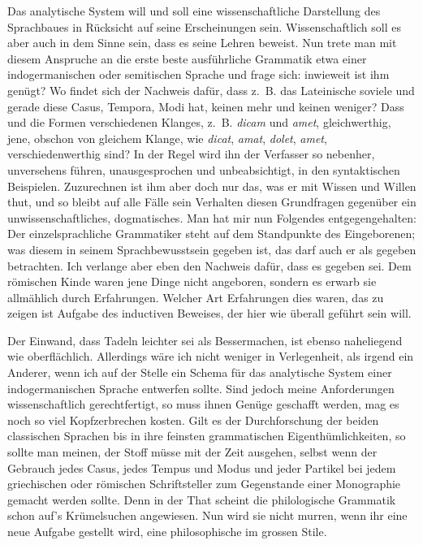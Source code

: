 Das analytische System will und soll eine wissenschaftliche Darstellung des Sprachbaues in Rücksicht auf seine Erscheinungen sein. Wissenschaftlich soll es aber auch in dem Sinne sein, dass es seine Lehren beweist. Nun trete man mit diesem Anspruche an die erste beste ausführliche Grammatik etwa einer indogermanischen oder semitischen Sprache und frage sich: inwieweit ist ihm \label{sp.92} genügt? Wo findet sich der Nachweis dafür, dass z.~B. das Lateinische soviele und gerade diese Casus, Tempora, Modi hat, keinen mehr und keinen weniger? Dass  und die Formen verschiedenen Klanges, z.~B. \textit{dicam} und \textit{amet}, gleichwerth\-ig, jene, obschon von gleichem Klange, wie \textit{dicat}, \textit{amat}, \textit{dolet}, \textit{amet}, verschiedenwerthig sind? In der Regel wird ihn der Verfasser so nebenher, unversehens führen, unausgesprochen und unbeabsichtigt, in den syntaktischen Beispielen. Zuzurechnen ist ihm aber doch nur das, was er mit Wissen und Willen thut, und so bleibt auf alle Fälle sein Verhalten diesen Grundfragen gegenüber ein unwissenschaftliches, dogmatisches. Man hat mir nun Folgendes entgegengehalten: Der einzelsprachliche Grammatiker steht auf dem Standpunkte des Eingeborenen; was diesem in seinem Sprachbewusstsein gegeben ist, das darf auch er als gegeben betrachten. Ich verlange aber eben den Nachweis dafür, dass es gegeben sei. Dem römischen Kinde waren jene Dinge nicht angeboren, sondern es erwarb sie allmählich durch Erfahrungen. Welcher Art Erfahrungen dies waren, das zu zeigen ist Aufgabe des inductiven Beweises, der hier wie überall geführt sein will.

Der Einwand, dass Tadeln leichter sei als Bessermachen, ist ebenso naheliegend wie oberflächlich. Allerdings wäre ich nicht weniger in Verlegenheit, als irgend ein Anderer, wenn ich auf der Stelle ein Schema für das analytische System einer indogermanischen Sprache entwerfen sollte. Sind jedoch meine Anforderungen wissenschaftlich gerechtfertigt, \label{fp.95} so muss ihnen Genüge geschafft werden, mag es noch so viel Kopfzerbrechen kosten. Gilt es der Durchforschung der beiden classischen Sprachen bis in ihre feinsten grammatischen Eigenthümlichkeiten, so sollte man meinen, der Stoff müsse mit der Zeit ausgehen, selbst wenn der Gebrauch jedes Casus, jedes Tempus und Modus und jeder Partikel bei jedem griechischen oder römischen Schriftsteller zum Gegenstande einer Monographie gemacht werden sollte. Denn in der That scheint die philologische Grammatik schon auf’s Krümelsuchen angewiesen. Nun wird sie nicht murren, wenn ihr eine neue Aufgabe gestellt wird, eine philosophische im grossen Stile.

